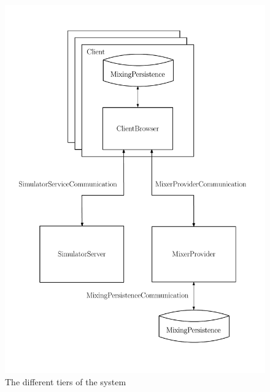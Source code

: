 \label{sec:moddesc}
\begin{figure}[h]
\label{fig:tierchannel}
  \centering
\includegraphics[scale=0.5]{SoftwareTiers}
\caption{The different tiers of the system}
\end{figure}
